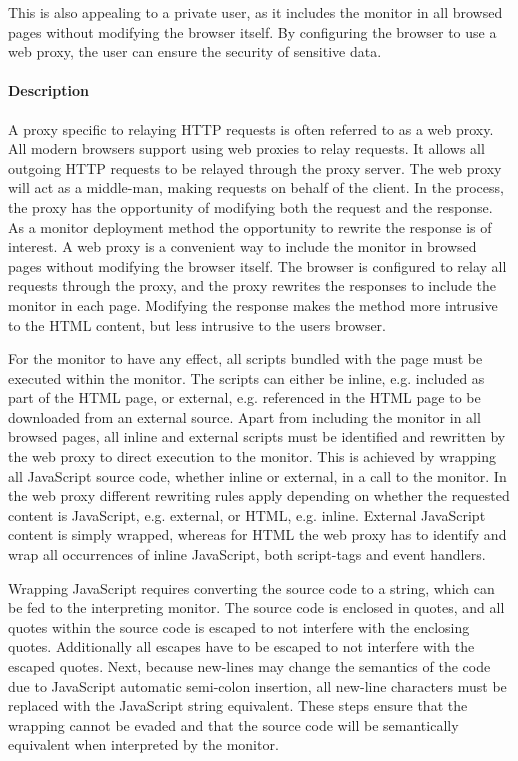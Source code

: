 \documentclass{llncs}
\begin{document}
This is also appealing to a private user, as it includes the monitor in all browsed pages without modifying 
the browser itself. By configuring the browser to use a web proxy, the user can ensure the security 
of sensitive data.

\paragraph{Description}
A proxy specific to relaying HTTP requests is often referred to as a web proxy.
All modern browsers support using web proxies to relay requests.
It allows all outgoing HTTP requests to be 
relayed through the proxy server. The web proxy will act as a middle-man, making 
requests on behalf of the client. In the process, the proxy has the 
opportunity of modifying both the request and the response. 
As a monitor deployment method the opportunity to rewrite the response is 
of interest. A web proxy is a convenient way to include the monitor in browsed pages without 
modifying the browser itself. The browser is configured to relay 
all requests through the proxy, and the proxy rewrites the responses to include 
the monitor in each page. Modifying the response makes the method more 
intrusive to the HTML content, but less intrusive to the users browser. 

For the monitor to have any effect, all scripts bundled with 
the page must be executed within the monitor. The scripts can either be inline, 
e.g. included as part of the HTML page, or external, e.g. referenced in the 
HTML page to be downloaded from an external source.
Apart from including the monitor in all browsed pages, all inline and external 
scripts must be identified and rewritten by the web proxy to direct execution to the monitor.
This is achieved by wrapping all JavaScript source code, whether inline or external, in a call to the monitor.
In the web proxy different rewriting rules apply depending on whether the 
requested content is JavaScript, e.g. external, or HTML, e.g. inline. External 
JavaScript content is simply wrapped, whereas 
for HTML the web proxy has to identify and wrap all occurrences of inline 
JavaScript, both script-tags and event handlers.

Wrapping JavaScript requires converting the source code to a string, which can 
be fed to the interpreting monitor. The source code is enclosed in quotes, and all 
quotes within the source code is escaped to not interfere with the enclosing quotes.
Additionally all escapes have to be escaped to not interfere with the escaped 
quotes. Next, because new-lines may change the semantics of the code due to 
JavaScript automatic semi-colon insertion, all new-line 
characters must be replaced with the JavaScript string equivalent.
These steps ensure that the wrapping cannot be evaded and that the source code 
will be semantically equivalent when interpreted by the monitor.
\end{document}
